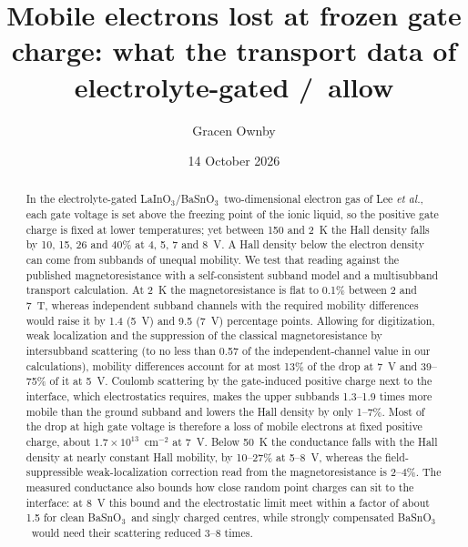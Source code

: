 \documentclass[11pt]{article}
\title{Mobile electrons lost at frozen gate charge: what the transport data of electrolyte-gated \LIO/\BSO\ allow}
\author{Gracen Ownby}
\affil{University of Oklahoma, Norman, Oklahoma, USA}
\date{\small 14 October 2026}
\newcommand{\LIO}{\texorpdfstring{LaInO$_3$}{LaInO3}}
\newcommand{\BSO}{\texorpdfstring{BaSnO$_3$}{BaSnO3}}
\begin{document}
\maketitle

\begin{abstract}
In the electrolyte-gated \LIO/\BSO\ two-dimensional electron gas of Lee \emph{et al.}, each gate voltage is set above the freezing point of the ionic liquid, so the positive gate charge is fixed at lower temperatures; yet between 150 and 2~K the Hall density falls by 10, 15, 26 and 40\% at 4, 5, 7 and 8~V. A Hall density below the electron density can come from subbands of unequal mobility. We test that reading against the published magnetoresistance with a self-consistent subband model and a multisubband transport calculation. At 2~K the magnetoresistance is flat to 0.1\% between 2 and 7~T, whereas independent subband channels with the required mobility differences would raise it by 1.4 (5~V) and 9.5 (7~V) percentage points. Allowing for digitization, weak localization and the suppression of the classical magnetoresistance by intersubband scattering (to no less than 0.57 of the independent-channel value in our calculations), mobility differences account for at most 13\% of the drop at 7~V and 39--75\% of it at 5~V. Coulomb scattering by the gate-induced positive charge next to the interface, which electrostatics requires, makes the upper subbands 1.3--1.9 times more mobile than the ground subband and lowers the Hall density by only 1--7\%. Most of the drop at high gate voltage is therefore a loss of mobile electrons at fixed positive charge, about $1.7\times10^{13}$~cm$^{-2}$ at 7~V. Below 50~K the conductance falls with the Hall density at nearly constant Hall mobility, by 10--27\% at 5--8~V, whereas the field-suppressible weak-localization correction read from the magnetoresistance is 2--4\%. The measured conductance also bounds how close random point charges can sit to the interface: at 8~V this bound and the electrostatic limit meet within a factor of about 1.5 for clean \BSO\ and singly charged centres, while strongly compensated \BSO\ would need their scattering reduced 3--8 times.
\end{abstract}
\end{document}
